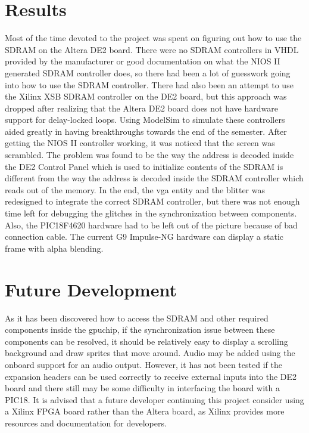 \documentclass{report}
\begin{document}
\section{Results}
Most of the time devoted to the project was spent on figuring out how to 
use the SDRAM on the Altera DE2 board. There were no SDRAM controllers 
in VHDL provided by the manufacturer or good documentation on what the 
NIOS II generated SDRAM controller does, so there had been a lot of 
guesswork going into how to use the SDRAM controller. There had also 
been an attempt to use the Xilinx XSB SDRAM controller on the DE2 board, 
but this approach was dropped after realizing that the Altera DE2 board 
does not have hardware support for delay-locked loops. Using ModelSim to 
simulate these controllers aided greatly in having breakthroughs towards 
the end of the semester. After getting the NIOS II controller working, 
it was noticed that the screen was scrambled. The problem was found to 
be the way the address is decoded inside the DE2 Control Panel which is 
used to initialize contents of the SDRAM is different from the way the 
address is decoded inside the SDRAM controller which reads out of the 
memory. In the end, the vga entity and the blitter was redesigned to 
integrate the correct SDRAM controller, but there was not enough time 
left for debugging the glitches in the synchronization between 
components. Also, the PIC18F4620 hardware had to be left out of the 
picture because of bad connection cable. The current G9 Impulse-NG 
hardware can display a static frame with alpha blending.

\section{Future Development}
As it has been discovered how to access the SDRAM and other required 
components inside the gpuchip, if the synchronization issue between 
these components can be resolved, it should be relatively easy to 
display a scrolling background and draw sprites that move around. Audio 
may be added using the onboard support for an audio output. However, it 
has not been tested if the expansion headers can be used correctly to 
receive external inputs into the DE2 board and there still may be some 
difficulty in interfacing the board with a PIC18. It is advised that a 
future developer continuing this project consider using a Xilinx FPGA 
board rather than the Altera board, as Xilinx provides more resources 
and documentation for developers.

\section*{}

\clearpage
{}
{}
\nocite{website:dualport}
\nocite{website:dualport}
\nocite{website:XSA}
\nocite{website:XSB}
\nocite{website:DE2}
\nocite{website:Avalon}
\nocite{website:PLL}
\nocite{website:G9Impulse}
\nocite{website:Using}



\end{document}
